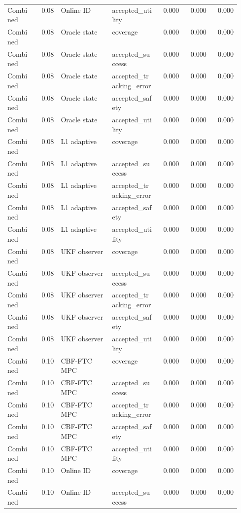 \documentclass{article}
\begin{document}
\begin{center}
\begin{longtable}{p{0.13\linewidth}rp{0.22\linewidth}p{0.20\linewidth}rrr}
Combined & 0.08 & Online ID & accepted\_utility & 0.000 & 0.000 & 0.000\\
Combined & 0.08 & Oracle state & coverage & 0.000 & 0.000 & 0.000\\
Combined & 0.08 & Oracle state & accepted\_success & 0.000 & 0.000 & 0.000\\
Combined & 0.08 & Oracle state & accepted\_tracking\_error & 0.000 & 0.000 & 0.000\\
Combined & 0.08 & Oracle state & accepted\_safety & 0.000 & 0.000 & 0.000\\
Combined & 0.08 & Oracle state & accepted\_utility & 0.000 & 0.000 & 0.000\\
Combined & 0.08 & L1 adaptive & coverage & 0.000 & 0.000 & 0.000\\
Combined & 0.08 & L1 adaptive & accepted\_success & 0.000 & 0.000 & 0.000\\
Combined & 0.08 & L1 adaptive & accepted\_tracking\_error & 0.000 & 0.000 & 0.000\\
Combined & 0.08 & L1 adaptive & accepted\_safety & 0.000 & 0.000 & 0.000\\
Combined & 0.08 & L1 adaptive & accepted\_utility & 0.000 & 0.000 & 0.000\\
Combined & 0.08 & UKF observer & coverage & 0.000 & 0.000 & 0.000\\
Combined & 0.08 & UKF observer & accepted\_success & 0.000 & 0.000 & 0.000\\
Combined & 0.08 & UKF observer & accepted\_tracking\_error & 0.000 & 0.000 & 0.000\\
Combined & 0.08 & UKF observer & accepted\_safety & 0.000 & 0.000 & 0.000\\
Combined & 0.08 & UKF observer & accepted\_utility & 0.000 & 0.000 & 0.000\\
Combined & 0.10 & CBF-FTC MPC & coverage & 0.000 & 0.000 & 0.000\\
Combined & 0.10 & CBF-FTC MPC & accepted\_success & 0.000 & 0.000 & 0.000\\
Combined & 0.10 & CBF-FTC MPC & accepted\_tracking\_error & 0.000 & 0.000 & 0.000\\
Combined & 0.10 & CBF-FTC MPC & accepted\_safety & 0.000 & 0.000 & 0.000\\
Combined & 0.10 & CBF-FTC MPC & accepted\_utility & 0.000 & 0.000 & 0.000\\
Combined & 0.10 & Online ID & coverage & 0.000 & 0.000 & 0.000\\
Combined & 0.10 & Online ID & accepted\_success & 0.000 & 0.000 & 0.000\\

\end{longtable}
\end{center}
\end{document}
